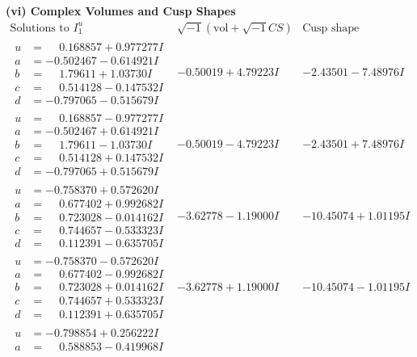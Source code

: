 \documentclass[1p]{elsarticle_modified}
\theoremstyle{definition}
\newcommand{\I}{\sqrt{-1}}
\begin{document}
\newpage\flushleft \textbf{(vi) Complex Volumes and Cusp Shapes}
$$\begin{array}{c|c|c}  
\text{Solutions to }I^u_{1}& \I (\text{vol} + \sqrt{-1}CS) & \text{Cusp shape}\\
 \hline 
\begin{aligned}
u &= \phantom{-}0.168857 + 0.977277 I \\
a &= -0.502467 - 0.614921 I \\
b &= \phantom{-}1.79611 + 1.03730 I \\
c &= \phantom{-}0.514128 - 0.147532 I \\
d &= -0.797065 - 0.515679 I\end{aligned}
 & -0.50019 + 4.79223 I & -2.43501 - 7.48976 I \\ \hline\begin{aligned}
u &= \phantom{-}0.168857 - 0.977277 I \\
a &= -0.502467 + 0.614921 I \\
b &= \phantom{-}1.79611 - 1.03730 I \\
c &= \phantom{-}0.514128 + 0.147532 I \\
d &= -0.797065 + 0.515679 I\end{aligned}
 & -0.50019 - 4.79223 I & -2.43501 + 7.48976 I \\ \hline\begin{aligned}
u &= -0.758370 + 0.572620 I \\
a &= \phantom{-}0.677402 + 0.992682 I \\
b &= \phantom{-}0.723028 - 0.014162 I \\
c &= \phantom{-}0.744657 - 0.533323 I \\
d &= \phantom{-}0.112391 - 0.635705 I\end{aligned}
 & -3.62778 - 1.19000 I & -10.45074 + 1.01195 I \\ \hline\begin{aligned}
u &= -0.758370 - 0.572620 I \\
a &= \phantom{-}0.677402 - 0.992682 I \\
b &= \phantom{-}0.723028 + 0.014162 I \\
c &= \phantom{-}0.744657 + 0.533323 I \\
d &= \phantom{-}0.112391 + 0.635705 I\end{aligned}
 & -3.62778 + 1.19000 I & -10.45074 - 1.01195 I \\ \hline\begin{aligned}
u &= -0.798854 + 0.256222 I \\
a &= \phantom{-}0.588853 - 0.419968 I \\

\end{aligned}
\end{array}$$
\end{document}
